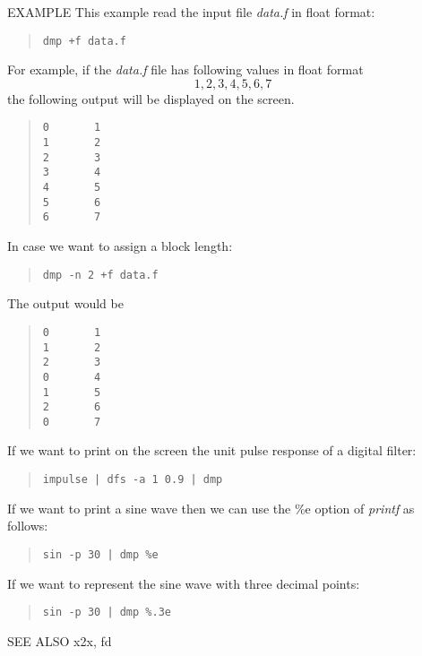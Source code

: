 \begin{qsection}{EXAMPLE}
This example read the input file {\em data.f} in float format:
\begin{quote}
 \verb!dmp +f data.f!
\end{quote}
For example, if the {\em data.f} file has following values
in float format
\begin{displaymath}
  1, 2, 3, 4, 5, 6, 7
\end{displaymath}
the following output will be displayed on the screen.
\begin{quote}
  \verb!0       1! \\
  \verb!1       2! \\
  \verb!2       3! \\
  \verb!3       4! \\
  \verb!4       5! \\
  \verb!5       6! \\
  \verb!6       7!
\end{quote}
\par
In case we want to assign a block length:
\begin{quote}
 \verb!dmp -n 2 +f data.f!
\end{quote}
The output would be
\begin{quote}
  \verb!0       1! \\
  \verb!1       2! \\
  \verb!2       3! \\
  \verb!0       4! \\
  \verb!1       5! \\
  \verb!2       6! \\
  \verb!0       7!
\end{quote}
\par
If we want to print on the screen the unit pulse response of a digital
filter:
\begin{quote}
  \verb!impulse | dfs -a 1 0.9 | dmp!
\end{quote}
\par
If we want to print a sine wave then we can use the \%e option of
{\em printf} as follows:
\begin{quote}
  \verb!sin -p 30 | dmp %e!
\end{quote}
\par
If we want to represent the sine wave with three decimal points:
\begin{quote}
  \verb!sin -p 30 | dmp %.3e!
\end{quote}
\end{qsection}

\begin{qsection}{SEE ALSO}
x2x, fd
\end{qsection}
